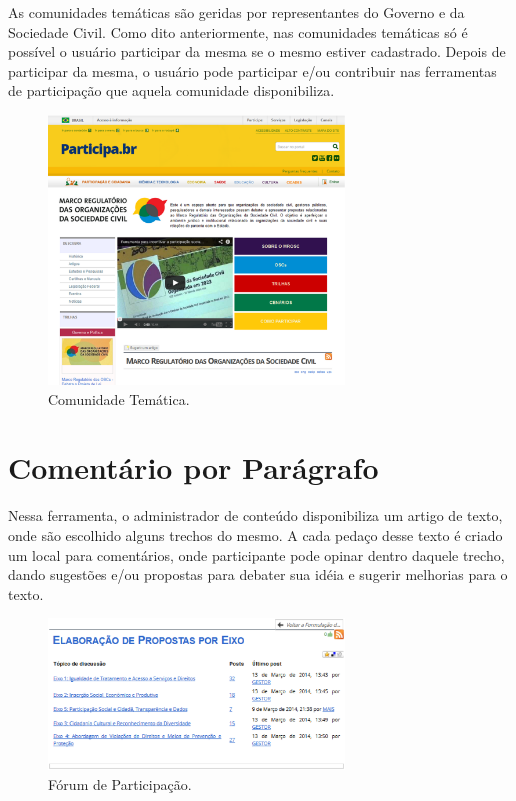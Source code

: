 %

As comunidades temáticas são geridas por representantes do Governo e da Sociedade Civil. Como dito anteriormente, nas comunidades temáticas só é possível o usuário participar da mesma se o mesmo estiver cadastrado. Depois de participar da mesma, o usuário pode participar e/ou contribuir nas ferramentas de participação que aquela comunidade disponibiliza.

\graphicspath{{figuras/}}
\begin{figure}[H]
\centering
\includegraphics[width=0.7\textwidth]{comunidades-tematicas}
\caption{Comunidade Temática.}
\label{fig:comunidadestematicas}
\end{figure}


\section*{Comentário por Parágrafo}

Nessa ferramenta, o administrador de conteúdo disponibiliza um artigo de texto, onde são escolhido alguns trechos do mesmo. A cada pedaço desse texto é criado um local para comentários, onde participante pode opinar dentro daquele trecho, dando sugestões e/ou propostas para debater sua idéia e sugerir melhorias para o texto.

\graphicspath{{figuras/}}
\begin{figure}[H]
\centering
\includegraphics[width=0.7\textwidth]{foruns-participacao}
\caption{Fórum de Participação.}
\label{fig:forumsparticipacao}
\end{figure}


